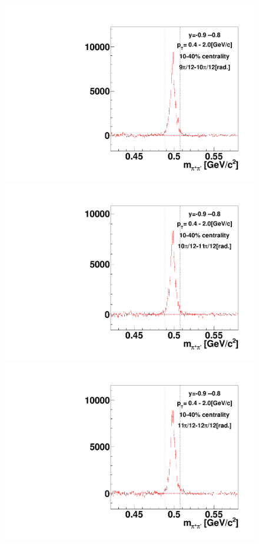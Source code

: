 \begin{figure}[h]
\includegraphics[width=0.14\linewidth]{chapterX/fig/ks_v1_sig/kf_ptslice0_cent1_ks_flow_phi10_rap13.pdf}
\includegraphics[width=0.14\linewidth]{chapterX/fig/ks_v1_sig/kf_ptslice0_cent1_ks_flow_phi11_rap13.pdf}
\includegraphics[width=0.14\linewidth]{chapterX/fig/ks_v1_sig/kf_ptslice0_cent1_ks_flow_phi12_rap13.pdf}


\end{figure}
